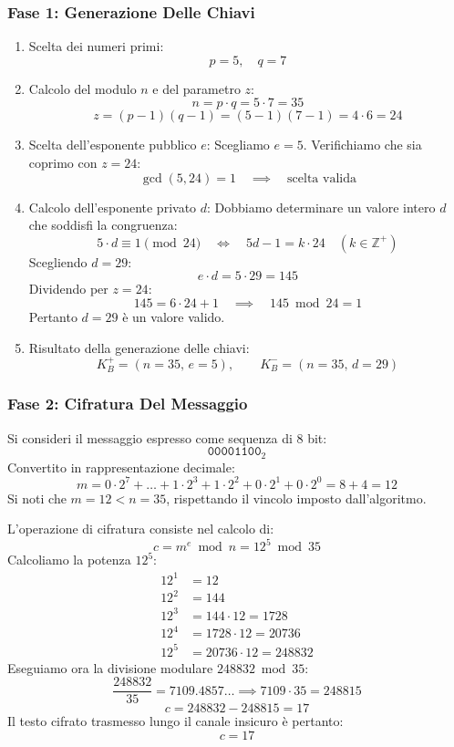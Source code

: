 \documentclass[11pt, a4paper]{article}
\begin{document}
\subsubsection{Fase 1: Generazione Delle Chiavi}
\begin{enumerate}[leftmargin=*]
    \item Scelta dei numeri primi:
    \[
    p = 5, \quad q = 7
    \]
    \item Calcolo del modulo $n$ e del parametro $z$:
    \[
    n = p \cdot q = 5 \cdot 7 = 35
    \]
    \[
    z = (p - 1)(q - 1) = (5 - 1)(7 - 1) = 4 \cdot 6 = 24
    \]
    \item Scelta dell'esponente pubblico $e$:
    Scegliamo $e = 5$. Verifichiamo che sia coprimo con $z = 24$:
    \[
    \gcd(5, 24) = 1 \quad \implies \quad \text{scelta valida}
    \]
    \item Calcolo dell'esponente privato $d$:
    Dobbiamo determinare un valore intero $d$ che soddisfi la congruenza:
    \[
    5 \cdot d \equiv 1 \pmod{24} \quad \iff \quad 5d - 1 = k \cdot 24 \quad (k \in \mathbb{Z}^+)
    \]
    Scegliendo $d = 29$:
    \[
    e \cdot d = 5 \cdot 29 = 145
    \]
    Dividendo per $z = 24$:
    \[
    145 = 6 \cdot 24 + 1 \quad \implies \quad 145 \bmod 24 = 1
    \]
    Pertanto $d = 29$ è un valore valido.
    \item Risultato della generazione delle chiavi:
    \[
    K_B^+ = (n=35, \, e=5), \qquad K_B^- = (n=35, \, d=29)
    \]
\end{enumerate}

\subsubsection{Fase 2: Cifratura Del Messaggio}
Si consideri il messaggio espresso come sequenza di 8 bit:
\[
\texttt{00001100}_2
\]
Convertito in rappresentazione decimale:
\[
m = 0 \cdot 2^7 + \dots + 1 \cdot 2^3 + 1 \cdot 2^2 + 0 \cdot 2^1 + 0 \cdot 2^0 = 8 + 4 = 12
\]
Si noti che $m = 12 < n = 35$, rispettando il vincolo imposto dall'algoritmo.

L'operazione di cifratura consiste nel calcolo di:
\[
c = m^e \bmod n = 12^5 \bmod 35
\]
Calcoliamo la potenza $12^5$:
\begin{align*}
    12^1 &= 12 \\
    12^2 &= 144 \\
    12^3 &= 144 \cdot 12 = 1728 \\
    12^4 &= 1728 \cdot 12 = 20736 \\
    12^5 &= 20736 \cdot 12 = 248832
\end{align*}
Eseguiamo ora la divisione modulare $248832 \bmod 35$:
\[
\frac{248832}{35} = 7109.4857\dots \implies 7109 \cdot 35 = 248815
\]
\[
c = 248832 - 248815 = 17
\]
Il testo cifrato trasmesso lungo il canale insicuro è pertanto:
\[
\boxed{c = 17}
\]
\end{document}

